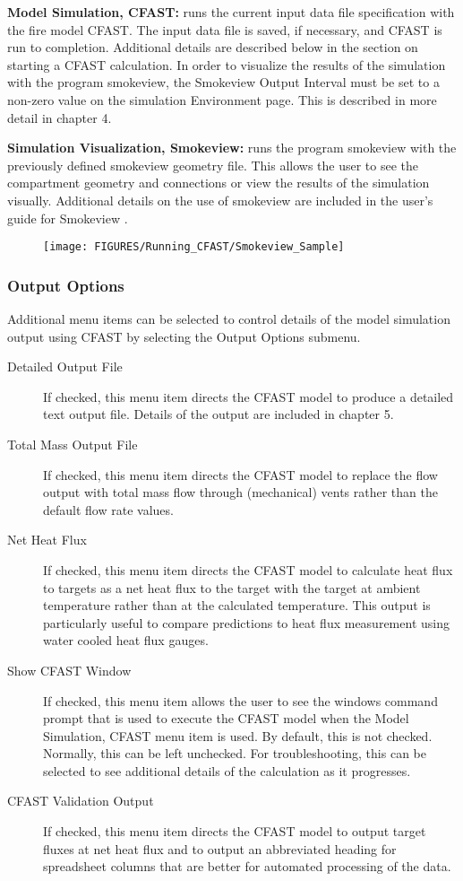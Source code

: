 \textbf{Model Simulation, CFAST:} runs the current input data file specification with the fire model CFAST.  The input data file is saved, if necessary, and CFAST is run to completion.  Additional details are described below in the section on starting a CFAST calculation. In order to visualize the results of the simulation with the program smokeview, the Smokeview Output Interval must be set to a non-zero value on the simulation Environment page.  This is described in more detail in chapter 4.

\textbf{Simulation Visualization, Smokeview:} runs the program smokeview with the previously defined smokeview geometry file. This allows the user to see the compartment geometry and connections or view the results of the simulation visually.  Additional details on the use of smokeview are included in the user's guide for Smokeview \cite{Smokeview_Users_Guide_6}.

\begin{figure}[h!]
\begin{center}
\texttt{[image: FIGURES/Running\_CFAST/Smokeview\_Sample]}
\end{center}
\end{figure}

\subsubsection{Output Options}

Additional menu items can be selected to control details of the model simulation output using CFAST by selecting the Output Options submenu.
\begin{description}
\item[Detailed Output File] If checked, this menu item directs the CFAST model to produce a detailed text output file.  Details of the output are included in chapter 5.
\item[Total Mass Output File] If checked, this menu item directs the CFAST model to replace the flow output with total mass flow through (mechanical) vents rather than the default flow rate values.
\item[Net Heat Flux]  If checked, this menu item directs the CFAST model to calculate heat flux to targets as a net heat flux to the target with the target at ambient temperature rather than at the calculated temperature.  This output is particularly useful to compare predictions to heat flux measurement using water cooled heat flux gauges.
\item[Show CFAST Window] If checked, this menu item allows the user to see the windows command prompt that is used to execute the CFAST model when the Model Simulation, CFAST menu item is used.  By default, this is not checked.  Normally, this can be left unchecked.  For troubleshooting, this can be selected to see additional details of the calculation as it progresses.
\item[CFAST Validation Output]If checked, this menu item directs the CFAST model to output target fluxes at net heat flux and to output an abbreviated heading for spreadsheet columns that are better for automated processing of the data.
\end{description}


